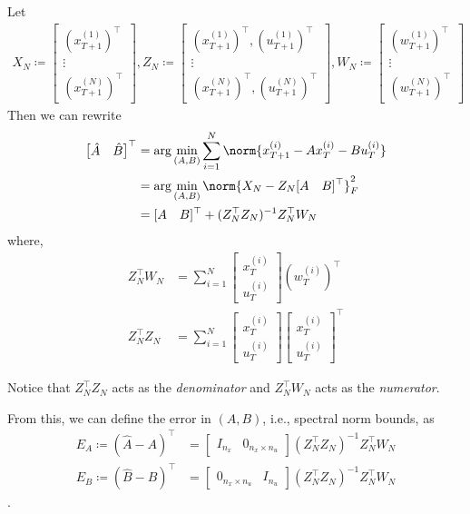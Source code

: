\documentclass{article}[12pt]
\begin{document}
Let
\begin{align*}
X_N \coloneqq 
\begin{bmatrix}
(x_{T+1}^{(1)})^\top\\
\vdots\\
(x_{T+1}^{(N)})^\top
\end{bmatrix},
Z_N \coloneqq 
\begin{bmatrix}
(x_{T+1}^{(1)})^\top, (u_{T+1}^{(1)})^\top\\
\vdots\\
(x_{T+1}^{(N)})^\top,(u_{T+1}^{(N)})^\top
\end{bmatrix},
W_N \coloneqq 
\begin{bmatrix}
(w_{T+1}^{(1)})^\top\\
\vdots\\
(w_{T+1}^{(N)})^\top
\end{bmatrix}
\end{align*}
Then we can rewrite
\begin{align*}
\begin{bmatrix}
\hat{A} & \hat{B}
\end{bmatrix}^\top
&=\arg\min_{(A,B)}\sum_{i=1}^{N} \norm{x_{T+1}^{(i)} - Ax_{T}^{(i)}- Bu_{T}^{(i)}}\\
&= \arg \min_{(A,B)} \norm{X_N - Z_N [A \quad B]^\top} ^2_F \\
&= [A \quad B]^\top + (Z_N^\top Z_N)^{-1}Z_N^\top W_N
\end{align*} 
where, 
\begin{align*}
Z_N^\top W_N & = \sum_{i=1}^{N} \begin{bmatrix}
x_T^{(i)} \\ u_T^{(i)}
\end{bmatrix}
(w_T^{(i)})^\top \\
Z_N^\top Z_N & = \sum_{i=1}^{N} 
\begin{bmatrix}
x_T^{(i)} \\ u_T^{(i)}
\end{bmatrix}
\begin{bmatrix}
x_T^{(i)} \\ u_T^{(i)}
\end{bmatrix}^\top
\end{align*}

Notice that $Z_N^\top Z_N $ acts as the \emph{denominator} and $Z_N^\top W_N$ acts as the \emph{numerator}.  

From this, we can define the error in $(A,B)$, i.e., spectral norm bounds, as
\begin{align*}
E_A \coloneqq (\hat{A}-A)^\top &= 
\begin{bmatrix}
I_{n_x} & 0_{n_x \times n_u}
\end{bmatrix}
(Z_N^\top Z_N)^{-1}Z_N^\top W_N \\
E_B \coloneqq (\hat{B}-B)^\top &= 
\begin{bmatrix}
0_{n_x \times n_u} & I_{n_u}
\end{bmatrix}
(Z_N^\top Z_N)^{-1}Z_N^\top W_N 
\end{align*}.
\end{document}
